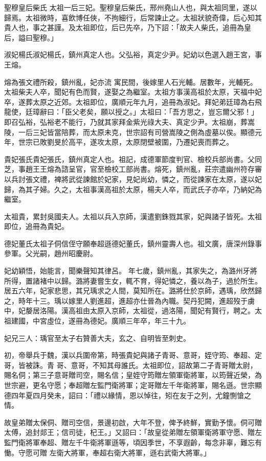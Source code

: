 
\begin{pinyinscope}

 聖穆皇后柴氏
 太祖一后三妃。聖穆皇后柴氏，邢州堯山人也，與太祖同里，遂以歸焉。太祖微時，喜飲博任俠，不拘細行，后常諫止之。太祖狀貌奇偉，后心知其貴人也，事之甚謹。及太祖即位，后已先卒，乃下詔：「故夫人柴氏，追冊為皇后，謚曰聖穆。」



 淑妃楊氏淑妃楊氏，鎮州真定人也。父弘裕，真定少尹。妃幼以色選入趙王宮，事王熔。



 熔為張文禮所殺，鎮州亂，妃亦流
 寓民間，後嫁里人石光輔。居數年，光輔死。太祖柴夫人卒，聞妃有色而賢，遂娶之為繼室。太祖方事漢高祖於太原，天福中妃卒，遂葬太原之近郊。太祖即位，廣順元年九月，追冊為淑妃。拜妃弟廷璋為右飛龍使，廷璋辭曰：「臣父老矣，願以授之。」太祖曰：「吾方思之，豈忘爾父邪！」即召弘裕，弘裕老不能行，乃就其家拜金紫光祿大夫、真定少尹。太祖崩，葬嵩陵，一后三妃皆當陪葬，而太原未克，世宗詔有司營嵩陵之側為虛墓以俟。顯德元年，世宗已敗劉旻於高平，遂攻太原，太原閉壁被圍，乃遷妃喪而葬之。



 貴妃張氏貴妃張氏，鎮州真定人也。祖記，成德軍節度判官、檢校兵部尚書。父同芝，事趙王王熔為諮呈官，官至檢校工部尚書。熔死，鎮州亂，莊宗遣幽州符存審以兵討張文禮，裨將武從諫館於妃家，見妃尚幼，憐之，而從諫家在太原，遂以妃歸，為其子婦。久之，太祖事漢高祖於太原，楊夫人卒，而武氏子亦卒，乃納妃為繼室。



 太祖貴，累封吳國夫人。太祖以兵入京師，漢遣劉銖戮其家，妃與諸子皆死。太祖即位，追冊為貴妃。



 德妃董氏太祖子侗信侄守願奉超遜德妃董氏，鎮州靈壽人也。祖文廣，唐深州錄事參軍。父光嗣，趙州昭慶尉。



 妃幼穎悟，始能言，聞樂聲知其律呂。
 年七歲，鎮州亂，其家失之，為潞州牙將所得，置諸褚中以歸。潞將妻嘗生女，輒不育，得妃憐之，養以為子，過於所生。居五六年，妃家悲思，其兄瑀求之人間，莫知所在。潞將仕於京師，遇瑀，欣然歸之，時年十三。瑀以嫁里人劉進超，進超亦仕晉為內職。契丹犯闕，進超歿于虜中，妃嫠居洛陽。漢高祖由太原入京師，太祖從，過洛陽，聞妃有賢行，聘之。太祖建國，中宮虛位，遂冊為德妃。廣順三年卒，年三十九。



 妃兄三人：瑀官至太子右贊善大夫，玄之、自明皆至刺史。



 初，帝舉兵于魏，漢以兵圍帝第，時張貴妃與諸子青哥、意哥，姪守筠、奉超、定哥，皆被誅。青
 哥、意哥，不知其母誰氏。太祖即位，詔故第二子青哥贈太尉，賜名侗；第三子意哥贈司空，賜名信；皇姪守筠贈左領軍衛將軍，以筠聲近榮，為世宗避，更名守愿；奉超贈左監門衛將軍；定哥贈左千年衛將軍，賜名遜。世宗顯德四年夏四月癸未，詔曰：「禮以緣情，恩以悼往，矧在友于之列，尤鐘惻愴之情。



 故皇弟贈太保侗、贈司空信，景邊初啟，大年不登，俾予終鮮，實勤予懷。侗可贈太傅，追封郯王；信司徒，杞王。」又詔曰：「故皇從弟贈左領軍衛將軍守愿、贈左監門衛將軍奉超、贈左千牛衛將軍遜等，頃因季世，不享遐齡，每念非辜，難忘有慟。守愿可贈
 左衛大將軍，奉超右衛大將軍，遜右武衛大將軍。」



\end{pinyinscope}